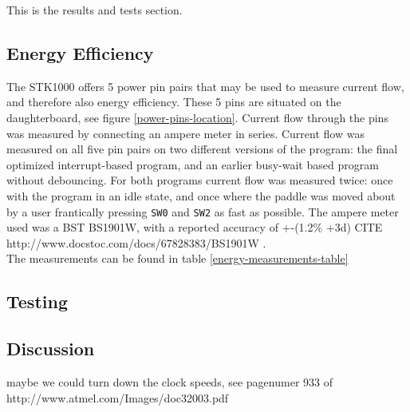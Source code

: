 
This is the results and tests section.

\subsection{Energy Efficiency}

The STK1000 offers 5 power pin pairs that may be used to measure current flow, and therefore also energy efficiency.
These 5 pins are situated on the daughterboard, see figure \ref{power-pins-location}.
Current flow through the pins was measured by connecting an ampere meter in series.
Current flow was measured on all five pin pairs on two different versions of the program: the final optimized interrupt-based program, and an earlier busy-wait based program without debouncing.
For both programs current flow was measured twice: once with the program in an idle state, and once where the paddle was moved about by a user frantically pressing \texttt{SW0} and \texttt{SW2} as fast as possible.
The ampere meter used was a BST BS1901W, with a reported accuracy of +-(1.2\% +3d) CITE http://www.docstoc.com/docs/67828383/BS1901W .
\\
The measurements can be found in table \ref{energy-measurements-table}


\subsection{Testing}

	


\subsection{Discussion}

maybe we could turn down the clock speeds, see pagenumer 933 of http://www.atmel.com/Images/doc32003.pdf


